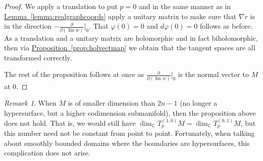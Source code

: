 \documentclass[12pt,openany]{book}
\renewcommand{\Im}{\operatorname{Im}}
\newcommand{\C}{{\mathbb{C}}}
\theoremstyle{plain}
\theoremstyle{remark}
\newtheorem{remark}[thm]{Remark}
\theoremstyle{definition}
\theoremstyle{exercise}
\theoremstyle{example}
\newcommand{\propref}[1]{\hyperref[#1]{Proposition~\ref*{#1}}}
\newcommand{\lemmaref}[1]{\hyperref[#1]{Lemma~\ref*{#1}}}
\begin{document}
\pagebreak[2]

\begin{proof}
We apply a translation to put $p=0$ and in the
same manner as in \lemmaref{lemma:realgraphcoords}
apply a unitary matrix to make sure that $\nabla r$ is
in the direction
$-\frac{\partial}{\partial (\Im w)}\big|_0$.  That $\varphi(0) = 0$
and $d\varphi(0) = 0$ follows as before.
As a translation and a unitary matrix are holomorphic
and in fact biholomorphic, then
via \propref{prop:holvectmap} we obtain that the tangent spaces are all
transformed correctly.

The rest of the proposition follows at once as
$\frac{\partial}{\partial (\Im w)}\big|_0$ is the normal vector to $M$
at $0$.
\end{proof}

\begin{remark}
When $M$ is of smaller dimension than $2n-1$ (no longer a hypersurface, but
a higher codimension submanifold), then the proposition above does not hold.
That is, we would still have $\dim_\C T_p^{(1,0)} M = \dim_\C T_p^{(0,1)}
M$, but this number need not be constant from point to point.  Fortunately,
when talking about smoothly bounded domains where the boundaries are
hypersurfaces, this complication does not arise.
\end{remark}
\end{document}
